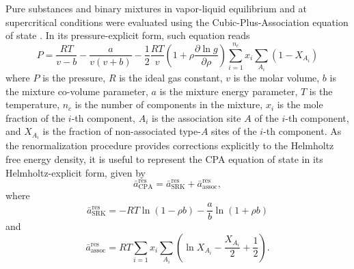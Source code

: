 \documentclass[preprint,12pt,3p]{elsarticle}
\begin{document}
Pure substances and binary mixtures in vapor-liquid equilibrium and at supercritical conditions were evaluated using the Cubic-Plus-Association equation of state \citep{kontogeorgis1996equation}.
In its pressure-explicit form, such equation reads
\begin{equation} \label{eq:pressure_cpa}
P = \frac{RT}{v-b}-\frac{a}{v(v+b)}-\frac{1}{2}\frac{RT}{v} \left(1+\rho\frac{\partial \ln g}{\partial \rho}\right)\sum_{i=1}^{n_c} x_{i} \sum_{A_{i}}(1-X_{A_{i}})
\end{equation}
where $P$ is the pressure,
$R$ is the ideal gas constant,
$v$ is the molar volume,
$b$ is the mixture co-volume parameter,
$a$ is the mixture energy parameter,
$T$ is the temperature,
$n_c$ is the number of components in the mixture,
$x_{i}$ is the mole fraction of the $i$-th component,
$A_{i}$ is the association site $A$ of the $i$-th component, and
$X_{A_{i}}$ is the fraction of non-associated type-$A$ sites of the $i$-th component.
As the renormalization procedure provides corrections explicitly to the Helmholtz free energy density, it is useful to represent the CPA equation of state in its Helmholtz-explicit form, given by
\begin{equation} \label{eq:helm_res_cpa}
\bar{a}_\text{CPA}^\text{res} =\bar{a}_\text{SRK}^\text{res} + \bar{a}_\text{assoc}^\text{res},
\end{equation}
where
\begin{equation} \label{eq:helm_res_srk}
\bar{a}_\text{SRK}^\text{res} = -RT\ln(1-\rho b)-\frac{a}{b}\ln(1+\rho b)   
\end{equation}
and
\begin{equation} \label{eq:helm_res_assoc}
\bar{a}_\text{assoc}^\text{res} = RT\sum_{i=1} x_{i} \sum_{A_{i}}\left(\ln X_{A_{i}} - \frac{X_{A_{i}}}{2} + \frac{1}{2}\right).
\end{equation}
\end{document}
